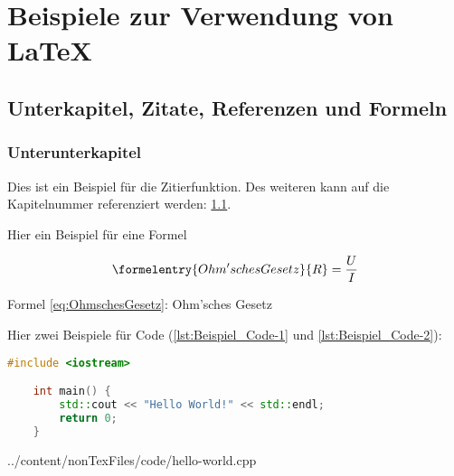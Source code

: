 
\chapter{Beispiele zur Verwendung von LaTeX}
   
\section{Unterkapitel, Zitate, Referenzen und Formeln}
\label{sec:Unterkapitel}

\subsection{Unterunterkapitel}

Dies ist ein Beispiel für die Zitierfunktion. \cite[Vgl.][S. 1 ff.]{Mustermann2023} Des weiteren kann auf die Kapitelnummer referenziert werden: \ref{sec:Unterkapitel}.


\vspace{0.5cm}
Hier ein Beispiel für eine Formel

\begin{equation}
    \formelentry{Ohm'sches Gesetz}      %
    {R} = \frac{U}{I}
    \label{eq:OhmschesGesetz}
\end{equation}
\begin{center}
    Formel \ref{eq:OhmschesGesetz}: Ohm'sches Gesetz
\end{center}



\vspace{0.5cm}
Hier zwei Beispiele für Code (\ref{lst:Beispiel_Code-1} und \ref{lst:Beispiel_Code-2}):

\begin{lstlisting}[language=C++, caption={Beispiel: direktes einfügen von Code}, label={lst:Beispiel_Code-1}]
    #include <iostream>

    int main() {
        std::cout << "Hello World!" << std::endl;
        return 0;
    }
\end{lstlisting}


{../content/nonTexFiles/code/hello-world.cpp}

